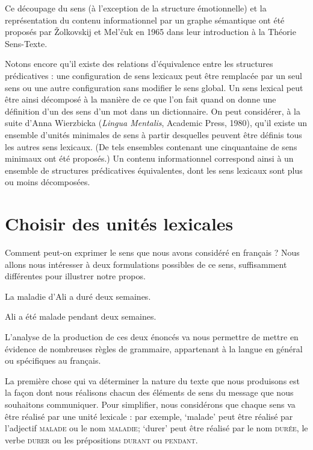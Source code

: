 {    Ce découpage du sens (à l’exception de la structure émotionnelle) et la représentation du contenu informationnel par un graphe sémantique ont été proposés par Žolkovskij et Mel’čuk en 1965 dans leur introduction à la Théorie Sens-Texte.

    Notons encore qu’il existe des relations d’équivalence entre les structures prédicatives : une configuration de sens lexicaux peut être remplacée par un seul sens ou une autre configuration sans modifier le sens global. Un sens lexical peut être ainsi décomposé à la manière de ce que l’on fait quand on donne une définition d’un des sens d’un mot dans un dictionnaire. On peut considérer, à la suite d’Anna Wierzbicka (\textit{Lingua Mentalis}, Academic Press, 1980), qu’il existe un ensemble d’unités minimales de sens à partir desquelles peuvent être définis tous les autres sens lexicaux. (De tels ensembles contenant une cinquantaine de sens minimaux ont été proposés.) Un contenu informationnel correspond ainsi à un ensemble de structures prédicatives équivalentes, dont les sens lexicaux sont plus ou moins décomposées.
}
\section{Choisir des unités lexicales}\label{sec:1.2.5}

Comment peut-on exprimer le sens que nous avons considéré en français ? Nous allons nous intéresser à deux formulations possibles de ce sens, suffisamment différentes pour illustrer notre propos.

\ea%
    \label{ex:key:1}

          La maladie d’Ali a duré deux semaines.
\ex%
    \label{ex:key:2}

           Ali a été malade pendant deux semaines.
\z

L’analyse de la production de ces deux énoncés va nous permettre de mettre en évidence de nombreuses règles de grammaire, appartenant à la langue en général ou spécifiques au français.

La première chose qui va déterminer la nature du texte que nous produisons est la façon dont nous réalisons chacun des éléments de sens du message que nous souhaitons communiquer. Pour simplifier, nous considérons que chaque sens va être réalisé par une unité lexicale : par exemple, ‘malade’ peut être réalisé par l’adjectif \textsc{malade} ou le nom \textsc{maladie}; ‘durer’ peut être réalisé par le nom \textsc{durée}, le verbe \textsc{durer} ou les prépositions \textsc{durant} ou \textsc{pendant}.

